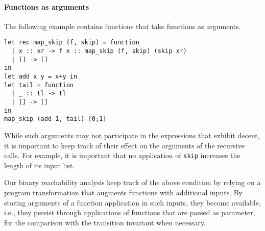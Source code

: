 \paragraph{\bf Functions as arguments}

The following example contains functions that take functions as
arguments.
%
\begin{center}
\begin{minipage}[h]{.8\linewidth}
\begin{small}
\begin{verbatim}
let rec map_skip (f, skip) = function
  | x :: xr -> f x :: map_skip (f, skip) (skip xr)
  | [] -> []
in
let add x y = x+y in
let tail = function
  | _ :: tl -> tl
  | [] -> []
in
map_skip (add 1, tail) [0;1]
\end{verbatim}
\end{small}
\end{minipage}
\end{center}
%
While such arguments may not participate in the expressions that
exhibit decent, it is important to keep track of their effect on the
arguments of the recursive calls.
For example, it is important that no application of \texttt{skip}
increases the length of its input list.

Our binary reachability analysis keep track of the above condition by
relying on a program transformation that augments functions with
additional inputs.
By storing arguments of a function application in such inputs, they
become available, i.e., they persist through applications of functions
that are passed as parameter, for the comparison with the transition
invariant when necessary. 

